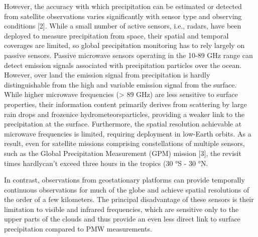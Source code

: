 \documentclass[11pt]{article}
\begin{document}
However, the accuracy with which precipitation can be estimated or detected from
satellite observations varies significantly with sensor type and observing
conditions [2]. While a small number of active sensors, i.e., radars, have been
deployed to measure precipitation from space, their spatial and temporal
coverages are limited, so global precipitation monitoring has to rely largely on
passive sensors. Passive microwave sensors operating in the 10-89 GHz range can
detect emission signals associated with precipitation particles over the ocean.
However, over land the emission signal from precipitation is hardly
distinguishable from the high and variable emission signal from the surface.
While higher microwave frequencies (> 89 GHz) are less sensitive to surface
properties, their information content primarily derives from scattering by large
rain drops and frozenice hydrometeorsparticles, providing a weaker link to the
precipitation at the surface. Furthermore, the spatial resolution achievable at
microwave frequencies is limited, requiring deployment in low-Earth orbits. As a
result, even for satellite missions comprising constellations of multiple
sensors, such as the Global Precipitation Measurement (GPM) mission [3], the
revisit times hardlycan’t exceed three hours in the tropics (30 °S - 30 °N.

In contrast, observations from geostationary platforms can provide temporally
continuous observations for much of the globe and achieve spatial resolutions of
the order of a few kilometers. The principal disadvantage of these sensors is
their limitation to visible and infrared frequencies, which are sensitive only
to the upper parts of the clouds and thus provide an even less direct link to
surface precipitation compared to PMW measurements.
\end{document}
